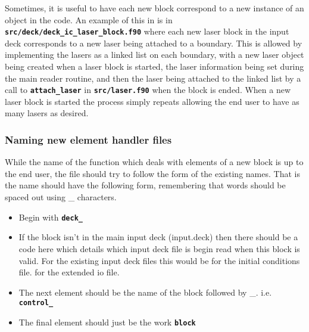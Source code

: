 \documentclass[12pt,a4paper]{article}
\newcommand{\inlinecode}[1]{{\color{warwickred} \bf\texttt{#1}}}
\newcommand{\EPOCH}{{\color{warwickdark}\fontfamily{phv}\selectfont{EPOCH}}}
\begin{document}
Sometimes, it is useful to have each new block correspond to a new instance of
an object in the code. An example of this in {\EPOCH} is in
\inlinecode{src/deck/deck\_ic\_laser\_block.f90} where each new laser block in
the input deck corresponds to a new laser being attached to a boundary. This is
allowed by implementing the lasers as a linked list on each boundary, with a
new laser object being created when a laser block is started, the laser
information being set during the main reader routine, and then the laser being
attached to the linked list by a call to \inlinecode{attach\_laser} in
\inlinecode{src/laser.f90} when the block is ended. When a new laser block is
started the process simply repeats allowing the end user to have as many lasers
as desired.

\subsubsection{Naming new element handler files}
While the name of the function which deals with elements of a new block is up
to the end user, the file should try to follow the form of the existing
names. That is the name should have the following form, remembering that words
should be spaced out using \_ characters.
\begin{itemize}
\item Begin with \inlinecode{deck\_}
\item If the block isn't in the main input deck (input.deck) then there
  should be a code here which details which input deck file is begin read
  when this block is valid. For the existing input deck files this would be
  \subitem \inlinecode{ic\_} for the initial conditions file.
  \subitem \inlinecode{eio\_} for the extended io file.
\item The next element should be the name of the block followed by \_.
  i.e. \inlinecode{control\_}
\item The final element should just be the work \inlinecode{block}
\end{itemize}
\end{document}
